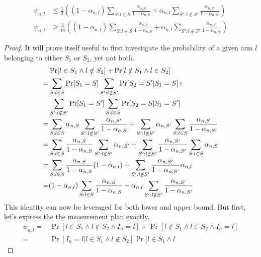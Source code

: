\textbf{}
\begin{align}
  \psi_{n, l} &\leq \frac{1}{2}((1 - \alpha_{n, l}) \sum_{S: l \in S}
      \frac{\alpha_{n, S}}{1 - \alpha_{n, S}} + \alpha_{n, l} \sum_{S': l
      \notin S'} \frac{\alpha_{n, S'}}{1 - \alpha_{n, S'}}) \\
  \psi_{n, l} &\geq \frac{1}{m}((1 - \alpha_{n, l}) \sum_{S: l \in S}
      \frac{\alpha_{n, S}}{1 - \alpha_{n, S}} + \alpha_{n, l} \sum_{S': l
      \notin S'} \frac{\alpha_{n, S'}}{1 - \alpha_{n, S'}})
\end{align}
\begin{proof}
  It will prove itself useful to first investigate the probability of a given
  arm $l$ belonging to either $S_1$ or $S_2$, yet not both.
  \begin{align}
    &\Pr[l \in S_1 \wedge l \notin S_2] + \Pr[l \notin S_1 \wedge l \in S_2]  \\
    =& \sum_{S: l \in S} \Pr[S_1 = S] \sum_{S': l \notin S'} \Pr[S_2 = S' | S_1
        = S] + \notag\\
    & \sum_{S': l \notin S'} \Pr[S_1 = S'] \sum_{S: l \in S} \Pr[S_2 = S | S_1
        = S'] \\
    =& \sum_{S: l \in S} \alpha_{n, S} \sum_{S': l \notin S'} \frac{\alpha_{n,
        S'}}{1 - \alpha_{n, S}} + \sum_{S': l \notin S'} \alpha_{n, S'}
        \sum_{S: l \in S} \frac{\alpha_{n, S}}{1 - \alpha_{n, S'}}\\
    =& \sum_{S: l \in S} \frac{\alpha_{n, S}}{1 - \alpha_{n, S}} \sum_{S': l
        \notin S'} \alpha_{n, S'} + \sum_{S': l \notin S'} \frac{\alpha_{n,
        S'}}{1 - \alpha_{n, S'}} \sum_{S: l \in S} \alpha_{n, S}\\
    =& \sum_{S: l \in S} \frac{\alpha_{n, S}}{1 - \alpha_{n, S}} (1 -
        \alpha_{n, l}) +  \sum_{S': l \notin S'} \frac{\alpha_{n, S'}}{1 -
        \alpha_{n, S'}} \alpha_{n, l} \\
    =& (1 - \alpha_{n, l})\sum_{S: l \in S} \frac{\alpha_{n, S}}{1 - \alpha_{n,
        S}} + \alpha_{n, l} \sum_{S': l \notin S'} \frac{\alpha_{n, S'}}{1 -
        \alpha_{n, S'}}
  \end{align}
  This identity can now be leveraged for both lower and upper bound. But first,
  let's express the the measurement plan exactly.
  \begin{align}
    \psi_{n, l} =& \Pr[l \in S_1 \wedge l \notin S_2 \wedge I_n = l] + \Pr[l
        \notin S_1 \wedge l \in S_2 \wedge I_n = l] \\
    =& \Pr[I_n = l | l \in S_1 \wedge l \notin S_2] \Pr[l \in S_1 \wedge l

\end{align}
\end{proof}
